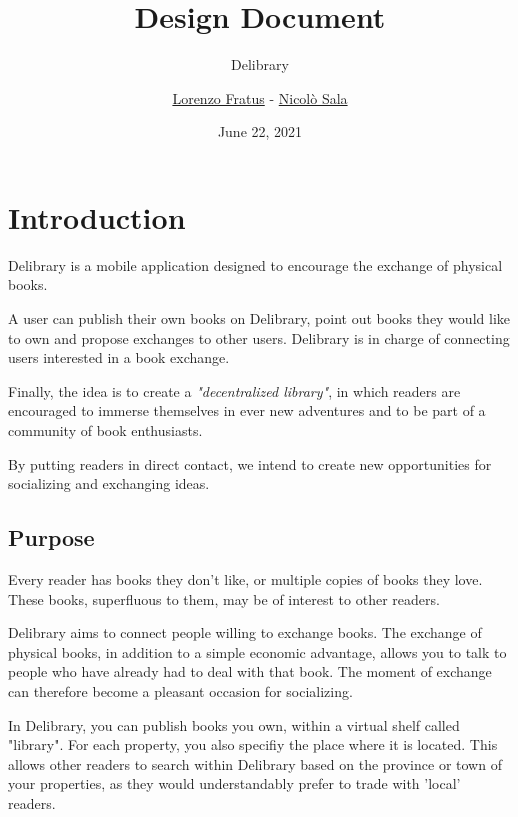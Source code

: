 
\graphicspath{ {assets/} }

\title{Design Document}
\subtitle{Delibrary}
\author{\href{https://github.com/lorenzofratus}{Lorenzo Fratus} - \href{https://github.com/nicheosala}{Nicolò Sala}}
\date{June 22, 2021}



\maketitle

\tableofcontents



\chapter{Introduction}
Delibrary is a mobile application designed to encourage the exchange of physical books.

A user can publish their own books on Delibrary, point out books they would like to own and propose exchanges to other users.
Delibrary is in charge of connecting users interested in a book exchange.

Finally, the idea is to create a \emph{"decentralized library"}, in which readers are encouraged to immerse themselves
in ever new adventures and to be part of a community of book enthusiasts.

By putting readers in direct contact, we intend to create new opportunities for socializing and exchanging ideas.

\section{Purpose}
Every reader has books they don't like, or multiple copies of books they love.
These books, superfluous to them, may be of interest to other readers.

Delibrary aims to connect people willing to exchange books.
The exchange of physical books, in addition to a simple economic advantage, allows you to talk to people who have already had to deal with that book.
The moment of exchange can therefore become a pleasant occasion for socializing.

In Delibrary, you can publish books you own, within a virtual shelf called "library".
For each property, you also specifiy the place where it is located. This allows other readers to search within Delibrary based on the province or town of your properties,
as they would understandably prefer to trade with 'local' readers.

